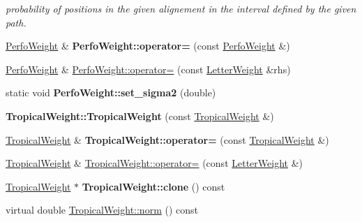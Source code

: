 \begin{DoxyCompactItemize}
\begin{DoxyCompactList}\small\item\em probability of positions in the given alignement in the interval defined by the given path. \end{DoxyCompactList}\item 
\mbox{\label{group__weight_ga00a9b370fb237b3230cbce5cf9d8fe41}} 
\mbox{\hyperlink{classPerfoWeight}{Perfo\+Weight}} \& {\bfseries Perfo\+Weight\+::operator=} (const \mbox{\hyperlink{classPerfoWeight}{Perfo\+Weight}} \&)
\item 
\mbox{\hyperlink{classPerfoWeight}{Perfo\+Weight}} \& \mbox{\hyperlink{group__weight_gaabb75d1419be3bb59dcdd3b8e56b0e63}{Perfo\+Weight\+::operator=}} (const \mbox{\hyperlink{classLetterWeight}{Letter\+Weight}} \&rhs)
\item 
\mbox{\label{group__weight_ga6761f06ee3b129a22fc0101f4947b4e9}} 
static void {\bfseries Perfo\+Weight\+::set\+\_\+sigma2} (double)
\item 
\mbox{\label{group__weight_ga17f51f13d0338bbcbc76ada716e626aa}} 
{\bfseries Tropical\+Weight\+::\+Tropical\+Weight} (const \mbox{\hyperlink{classTropicalWeight}{Tropical\+Weight}} \&)
\item 
\mbox{\label{group__weight_gaa275b4800bdc220d59ee42b2165f638a}} 
\mbox{\hyperlink{classTropicalWeight}{Tropical\+Weight}} \& {\bfseries Tropical\+Weight\+::operator=} (const \mbox{\hyperlink{classTropicalWeight}{Tropical\+Weight}} \&)
\item 
\mbox{\hyperlink{classTropicalWeight}{Tropical\+Weight}} \& \mbox{\hyperlink{group__weight_ga3aeb0d5a945daa39a0ed9a02fe92f246}{Tropical\+Weight\+::operator=}} (const \mbox{\hyperlink{classLetterWeight}{Letter\+Weight}} \&)
\item 
\mbox{\label{group__weight_ga378883be65a16bb86f13b1a9d941f104}} 
\mbox{\hyperlink{classTropicalWeight}{Tropical\+Weight}} $\ast$ {\bfseries Tropical\+Weight\+::clone} () const
\item 
virtual double \mbox{\hyperlink{group__weight_gabea8959ba2b8538194c3aadf5f9e4941}{Tropical\+Weight\+::norm}} () const
\item 
\mbox{\label{group__weight_ga9b479f4a9f23f4c423729b669aa69dc5}} 

\end{DoxyCompactItemize}
